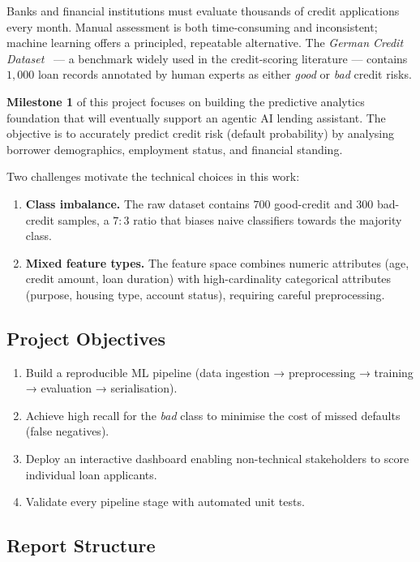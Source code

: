 \documentclass[12pt,a4paper]{article}
\theoremstyle{definition}
\begin{document}
Banks and financial institutions must evaluate thousands of credit applications
every month.  Manual assessment is both time-consuming and inconsistent; machine
learning offers a principled, repeatable alternative.  The \emph{German Credit
Dataset}~\cite{dua2019} — a benchmark widely used in the credit-scoring literature
— contains $1{,}000$ loan records annotated by human experts as either
\emph{good} or \emph{bad} credit risks.

\textbf{Milestone 1} of this project focuses on building the predictive analytics
foundation that will eventually support an agentic AI lending assistant.  The
objective is to accurately predict credit risk (default probability) by analysing
borrower demographics, employment status, and financial standing.

Two challenges motivate the technical choices in this work:

\begin{enumerate}
  \item \textbf{Class imbalance.}  The raw dataset contains $700$ good-credit and
        $300$ bad-credit samples, a $7{:}3$ ratio that biases naive classifiers
        towards the majority class.
  \item \textbf{Mixed feature types.}  The feature space combines numeric
        attributes (age, credit amount, loan duration) with high-cardinality
        categorical attributes (purpose, housing type, account status), requiring
        careful preprocessing.
\end{enumerate}

\subsection{Project Objectives}

\begin{enumerate}
  \item Build a reproducible ML pipeline (data ingestion → preprocessing →
        training → evaluation → serialisation).
  \item Achieve high recall for the \emph{bad} class to minimise the cost of
        missed defaults (false negatives).
  \item Deploy an interactive dashboard enabling non-technical stakeholders to
        score individual loan applicants.
  \item Validate every pipeline stage with automated unit tests.
\end{enumerate}

\subsection{Report Structure}
\end{document}
